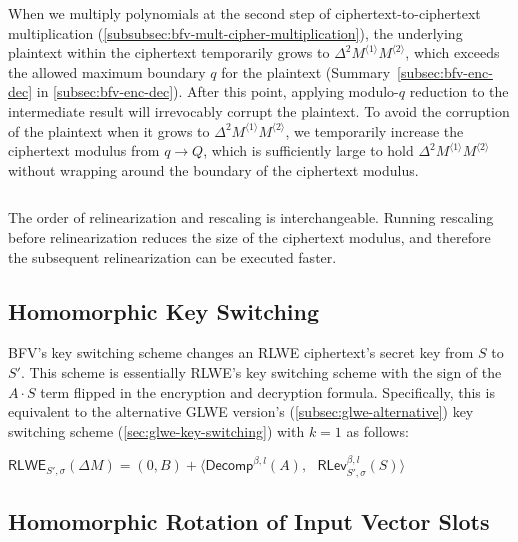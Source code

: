  When we multiply polynomials at the second step of ciphertext-to-ciphertext multiplication (\autoref{subsubsec:bfv-mult-cipher-multiplication}), the underlying plaintext within the ciphertext temporarily grows to $\Delta^2 M^{\langle 1 \rangle} M^{\langle 2 \rangle}$, which exceeds the allowed maximum boundary $q$ for the plaintext (Summary~\ref*{subsec:bfv-enc-dec} in \autoref{subsec:bfv-enc-dec}). After this point, applying modulo-$q$ reduction to the intermediate result will irrevocably corrupt the plaintext. To avoid the corruption of the plaintext when it grows to $\Delta^2 M^{\langle 1 \rangle} M^{\langle 2 \rangle}$, we temporarily increase the ciphertext modulus from $q \rightarrow Q$, which is sufficiently large to hold $\Delta^2 M^{\langle 1 \rangle} M^{\langle 2 \rangle}$ without wrapping around the boundary of the ciphertext modulus. 

$ $

 The order of relinearization and rescaling is interchangeable. Running rescaling before relinearization reduces the size of the ciphertext modulus, and therefore the subsequent relinearization can be executed faster. 


\subsection{Homomorphic Key Switching}
\label{subsec:bfv-key-switching}

BFV's key switching scheme changes an RLWE ciphertext's secret key from $S$ to $S'$. This scheme is essentially RLWE's key switching scheme with the sign of the $A\cdot S$ term flipped in the encryption and decryption formula. Specifically, this is equivalent to the alternative GLWE version's (\autoref{subsec:glwe-alternative}) key switching scheme (\autoref{sec:glwe-key-switching}) with $k = 1$ as follows:

\begin{tcolorbox}[title={\textbf{\tboxlabel{\ref*{subsec:bfv-key-switching}} BFV's Key Switching}}]
$\textsf{RLWE}_{S',\sigma}(\Delta M) = (0, B) + \bm{\langle} \textsf{Decomp}^{\beta, l}(A), \text{ } \textsf{RLev}_{S', \sigma}^{\beta, l}(S) \bm{\rangle}$
\end{tcolorbox}




\subsection{Homomorphic Rotation of Input Vector Slots}
\label{subsec:bfv-rotation}


